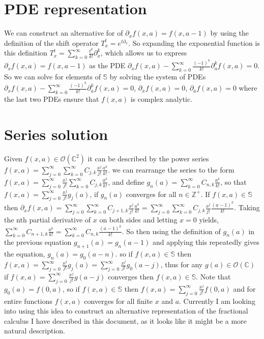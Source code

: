 \documentclass[%
 onecolumn,
 amsmath, amssymb, aps, pra, 10pt
]{revtex4-2}
\begin{document}
\section*{PDE representation}
We can construct an alternative for of $\partial_x f(x, a) = f(x, a - 1)$ by using the definition of the shift operator $T_{x}^{t} = e^{t \partial_x}$. So expanding the exponential function is this definition $T_{x}^t = \sum_{k=0}^{\infty} \frac{t^k}{k!} \partial_{x}^{k}$, which allows us to express $\partial_x f(x, a) = f(x, a - 1)$ as the PDE $\partial_x f(x, a) - \sum_{k=0}^{\infty} \frac{(-1)^k}{k!}\partial_{a}^{k} f(x, a) = 0$. So we can solve for elements of $\mathbb{S}$ by solving the system of PDEs $\partial_x f(x, a) - \sum_{k=0}^{\infty} \frac{(-1)^k}{k!} \partial_{a}^{k} f(x, a) = 0$, $\partial_{\bar{x}} f(x, a) = 0$, $\partial_{\bar{a}} f(x, a) = 0$ where the last two PDEs ensure that $f(x, a)$ is complex analytic.

\section*{Series solution}
Given $f(x, a) \in \mathcal{O}(\mathbb{C}^2)$ it can be described by the power series $f(x, a) = \sum_{j=0}^{\infty} \sum_{k=0}^{\infty} C_{j, k} \frac{x^j}{j!} \frac{a^k}{k!}$. we can rearrange the series to  the form $f(x, a) = \sum_{j=0}^{\infty} \frac{x^j}{j!} \sum_{k=0}^{\infty} C_{j, k} \frac{a^k}{k!}$, and define $g_n(a) = \sum_{k=0}^{\infty} C_{n, k} \frac{a^k}{k!}$, so that $f(x, a) = \sum_{j=0}^{\infty} \frac{x^j}{j!} g_j(a)$, if $g_n(a)$ converges for all $n \in \mathbb{Z}^+$. If $f(x, a) \in \mathbb{S}$ then $\partial_x f(x, a) = \sum_{j=0}^{\infty} \sum_{k=0}^{\infty} C_{j + 1, k} \frac{x^j}{j!} \frac{a^k}{k!} = \sum_{j=0}^{\infty} \sum_{k=0}^{\infty} C_{j, k} \frac{x^j}{j!} \frac{(a - 1)^k}{k!}$. Taking the nth partial derivative of $x$ on both sides and letting $x=0$ yields, $\sum_{k=0}^{\infty} C_{n + 1, k} \frac{a^k}{k!} = \sum_{k=0}^{\infty} C_{n, k} \frac{(a -1)^k}{k!}$. So then using the definition of $g_n(a)$ in the previous equation $g_{n+1}(a) = g_{n}(a - 1)$ and applying this repeatedly gives the equation, $g_{n}(a) = g_{0}(a - n)$. so if $f(x, a) \in \mathbb{S}$ then $f(x, a) = \sum_{j=0}^{\infty} \frac{x^j}{j!} g_{j}(a) = \sum_{j=0}^{\infty} \frac{x^j}{j!} g_{0}(a - j)$, thus for any $g(a) \in \mathcal{O}(\mathbb{C})$ if $f(x, a) = \sum_{j=0}^{\infty} \frac{x^j}{j!} g(a - j)$ converges then $f(x, a) \in \mathbb{S}$. Note that $g_{0}(a) = f(0, a)$, so if $f(x, a) \in \mathbb{S}$ then $f(x, a) = \sum_{j=0}^{\infty} \frac{x^j}{j!} f(0, a)$ and for entire functions $f(x, a)$ converges for all finite $x$ and $a$. Currently I am looking into using this idea to construct an alternative representation of the fractional calculus I have described in this document, as it looks like it might be a more natural description.



\end{document}
